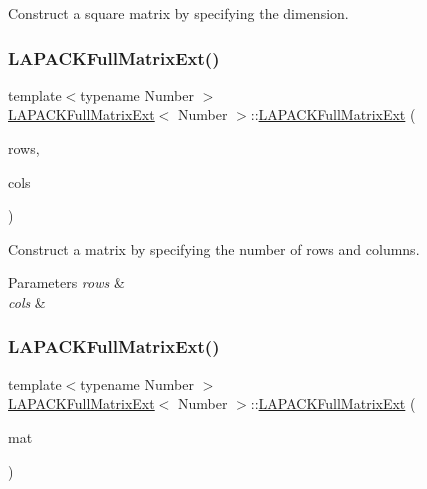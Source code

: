 Construct a square matrix by specifying the dimension. \mbox{\label{classLAPACKFullMatrixExt_a82986acedd4e702133151cb9a3ae2c97}} 
\subsubsection{\texorpdfstring{L\+A\+P\+A\+C\+K\+Full\+Matrix\+Ext()}{LAPACKFullMatrixExt()}\hspace{0.1cm}{\footnotesize\ttfamily [2/10]}}
{\footnotesize\ttfamily template$<$typename Number $>$ \\
\hyperlink{classLAPACKFullMatrixExt}{L\+A\+P\+A\+C\+K\+Full\+Matrix\+Ext}$<$ Number $>$\+::\hyperlink{classLAPACKFullMatrixExt}{L\+A\+P\+A\+C\+K\+Full\+Matrix\+Ext} (\begin{DoxyParamCaption}\item[{const \hyperlink{classLAPACKFullMatrixExt_a5cf5f4a6104dc17029210b5ca52bf574}{size\+\_\+type}}]{rows,  }\item[{const \hyperlink{classLAPACKFullMatrixExt_a5cf5f4a6104dc17029210b5ca52bf574}{size\+\_\+type}}]{cols }\end{DoxyParamCaption})}

Construct a matrix by specifying the number of rows and columns. 
\begin{DoxyParams}{Parameters}
{\em rows} & \\
\hline
{\em cols} & \\
\hline
\end{DoxyParams}
\mbox{\label{classLAPACKFullMatrixExt_a95c6843f5138c51aa42b554ec843b717}} 
\subsubsection{\texorpdfstring{L\+A\+P\+A\+C\+K\+Full\+Matrix\+Ext()}{LAPACKFullMatrixExt()}\hspace{0.1cm}{\footnotesize\ttfamily [3/10]}}
{\footnotesize\ttfamily template$<$typename Number $>$ \\
\hyperlink{classLAPACKFullMatrixExt}{L\+A\+P\+A\+C\+K\+Full\+Matrix\+Ext}$<$ Number $>$\+::\hyperlink{classLAPACKFullMatrixExt}{L\+A\+P\+A\+C\+K\+Full\+Matrix\+Ext} (\begin{DoxyParamCaption}\item[{const \hyperlink{classLAPACKFullMatrixExt}{L\+A\+P\+A\+C\+K\+Full\+Matrix\+Ext}$<$ Number $>$ \&}]{mat }\end{DoxyParamCaption})}

